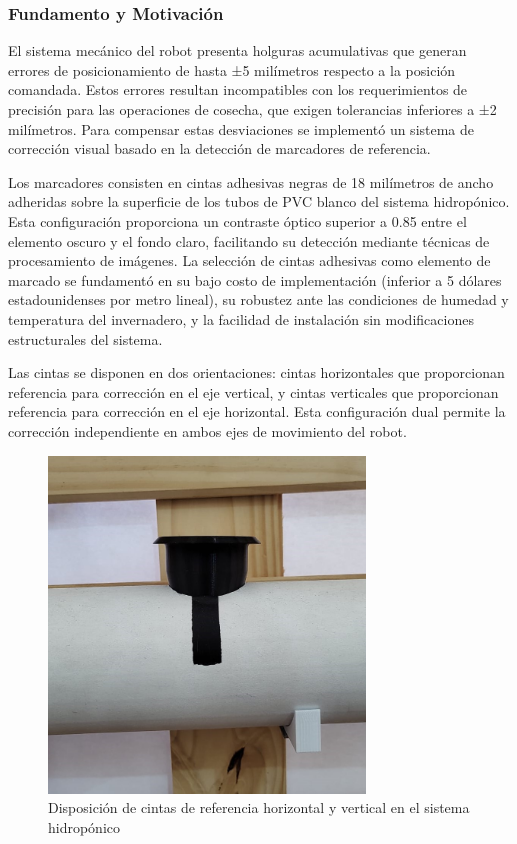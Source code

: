 \subsubsection{Fundamento y Motivación}

El sistema mecánico del robot presenta holguras acumulativas que generan errores de posicionamiento de hasta ±5 milímetros respecto a la posición comandada. Estos errores resultan incompatibles con los requerimientos de precisión para las operaciones de cosecha, que exigen tolerancias inferiores a ±2 milímetros. Para compensar estas desviaciones se implementó un sistema de corrección visual basado en la detección de marcadores de referencia.

Los marcadores consisten en cintas adhesivas negras de 18 milímetros de ancho adheridas sobre la superficie de los tubos de PVC blanco del sistema hidropónico. Esta configuración proporciona un contraste óptico superior a 0.85 entre el elemento oscuro y el fondo claro, facilitando su detección mediante técnicas de procesamiento de imágenes. La selección de cintas adhesivas como elemento de marcado se fundamentó en su bajo costo de implementación (inferior a 5 dólares estadounidenses por metro lineal), su robustez ante las condiciones de humedad y temperatura del invernadero, y la facilidad de instalación sin modificaciones estructurales del sistema.

Las cintas se disponen en dos orientaciones: cintas horizontales que proporcionan referencia para corrección en el eje vertical, y cintas verticales que proporcionan referencia para corrección en el eje horizontal. Esta configuración dual permite la corrección independiente en ambos ejes de movimiento del robot.

\begin{figure}[h]
\centering
\includegraphics[width=0.75\textwidth]{imagenes/configuracion_cintas_referencia.jpg}
\caption{Disposición de cintas de referencia horizontal y vertical en el sistema hidropónico}
\label{fig:configuracion_cintas}
\end{figure}
